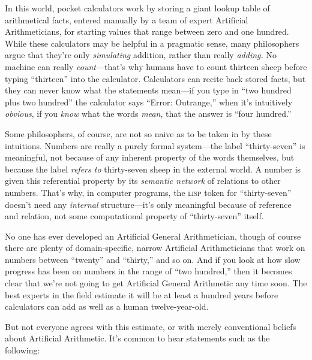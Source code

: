 {
 In this world, pocket calculators work by storing a giant lookup
table of arithmetical facts, entered manually by a team of expert
Artificial Arithmeticians, for starting values that range between zero
and one hundred. While these calculators may be helpful in a pragmatic
sense, many philosophers argue that they're only
\textit{simulating} addition, rather than really \textit{adding.} No
machine can really \textit{count}{}---that's why humans
have to count thirteen sheep before typing
``thirteen'' into the calculator.
Calculators can recite back stored facts, but they can never know what
the statements mean---if you type in ``two hundred
plus two hundred'' the calculator says
``Error: Outrange,'' when
it's intuitively \textit{obvious}, if you \textit{know}
what the words \textit{mean}, that the answer is
``four hundred.''}

{
 Some philosophers, of course, are not so naive as to be taken in
by these intuitions. Numbers are really a purely formal system---the
label ``thirty-seven'' is
meaningful, not because of any inherent property of the words
themselves, but because the label \textit{refers to} thirty-seven sheep
in the external world. A number is given this referential property by
its \textit{semantic network} of relations to other numbers.
That's why, in computer programs, the \textsc{lisp} token for
``thirty-seven''
doesn't need any \textit{internal}
structure---it's only meaningful because of reference
and relation, not some computational property of
``thirty-seven'' itself.}

{
 No one has ever developed an Artificial General Arithmetician,
though of course there are plenty of domain-specific, narrow Artificial
Arithmeticians that work on numbers between
``twenty'' and
``thirty,'' and so on. And if you
look at how slow progress has been on numbers in the range of
``two hundred,'' then it becomes
clear that we're not going to get Artificial General
Arithmetic any time soon. The best experts in the field estimate it
will be at least a hundred years before calculators can add as well as
a human twelve-year-old.}

{
 But not everyone agrees with this estimate, or with merely
conventional beliefs about Artificial Arithmetic. It's
common to hear statements such as the following:}

